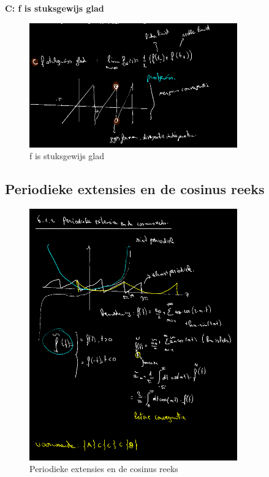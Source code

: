 \documentclass[a4paper]{report}
\begin{document}
\textbf{C: f is stuksgewijs glad}

\begin{figure}[H]
	\centering
	\includegraphics[width=0.8\textwidth]{assets/f_is_stukgewijs_continue.png}
	\caption{f is stuksgewijs glad}
	\label{fig:f_is_stukgewijs_glad}
\end{figure}

\subsection{Periodieke extensies en de cosinus reeks}

\begin{figure}[H]
	\centering
	\includegraphics[width=0.8\textwidth]{assets/periodieke_extensies_en_cosinusreeks.png}
	\caption{Periodieke extensies en de cosinus reeks}
	\label{fig:periodieke_extensies_en_cosinusreeks}
\end{figure}
\end{document}
